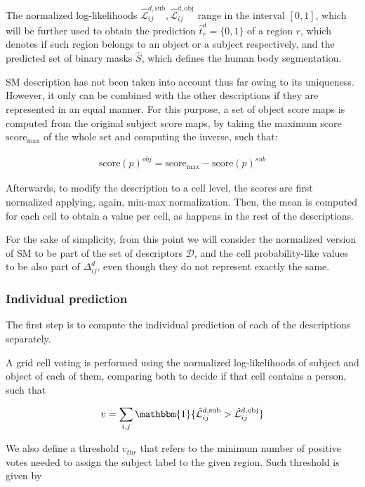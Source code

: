 \documentclass[10pt,twocolumn,letterpaper]{article}
\begin{document}
The normalized log-likelihoods $\hat{\mathcal{L}}_{ij}^{d,\mathrm{sub}},\hat{\mathcal{L}}_{ij}^{d,\mathrm{obj}}$ range in the interval $[0, 1]$, which will be further used to obtain the prediction $\hat{t}_{r}^{d} = \{0, 1\}$ of a region $r$, which denotes if such region belongs to an object or a subject respectively, and the predicted set of binary masks $\hat{S}$, which defines the human body segmentation.

SM description has not been taken into account thus far owing to its uniqueness. However, it only can be combined with the other descriptions if they are represented in an equal manner. For this purpose, a set of object score maps is computed from the original subject score maps, by taking the maximum score $\text{score}_\text{max}$ of the whole set and computing the inverse, such that:

\begin{gather}
\text{score}(p)^{obj} = \text{score}_\text{max} - \text{score}(p)^{sub}
\end{gather}

Afterwards, to modify the description to a cell level, the scores are first normalized applying, again, min-max normalization. Then, the mean is computed for each cell to obtain a value per cell, as happens in the rest of the descriptions. 

For the sake of simplicity, from this point we will consider the normalized version of SM to be part of the set of descriptors $\mathcal{D}$, and the cell probability-like values to be also part of $\Delta_{ij}^d$, even though they do not represent exactly the same.

\subsubsection{Individual prediction}
The first step is to compute the individual prediction of each of the descriptions separately. 

A grid cell voting is performed using the normalized log-likelihoods of subject and object of each of them, comparing both to decide if that cell contains a person, such that

\begin{gather}
v =  \sum_{i,j} \mathbbm{1}\{\hat{\mathcal{L}}_{ij}^{d,\mathrm{sub}} >\hat{\mathcal{L}}_{ij}^{d,\mathrm{obj}}\}
\end{gather}

We also define a threshold $v_{thr}$ that refers to the minimum number of positive votes needed to assign the subject label to the given region. Such threshold is given by
\end{document}

